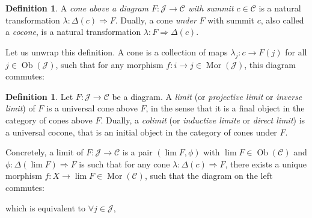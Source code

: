 \documentclass{article}
\newcommand{\cat}{\mathcal{C}}
\newcommand{\Jcat}{\mathcal{J}}
\DeclareMathOperator{\Ob}{Ob}
\DeclareMathOperator{\Mor}{Mor}
\theoremstyle{plain}
\theoremstyle{definition}
\newtheorem{definition}[theorem]{Definition}
\theoremstyle{remark}
\begin{document}
\begin{definition}
    A \emph{cone above a diagram $F : \Jcat \to \cat$ with summit $c\in \cat$} is a natural transformation $\lambda : \Delta(c) \Rightarrow F$. Dually, a cone \emph{under} $F$ with summit $c$, also called a \emph{cocone}, is a natural transformation $\lambda : F \Rightarrow \Delta(c)$.
\end{definition}

Let us unwrap this definition. A cone is a collection of maps $\lambda_j : c \to F(j)$ for all $j \in \Ob(\Jcat)$, such that for any morphism $f : i \to j \in \Mor(\Jcat)$, this diagram commutes:
\begin{center}
\end{center}

\begin{definition}
    Let $F : \Jcat \to \cat$ be a diagram. A \emph{limit} (or \emph{projective limit} or \emph{inverse limit}) of $F$ is a universal cone above $F$, in the sense that it is a final object in the category of cones above $F$. Dually, a \emph{colimit} (or \emph{inductive limite} or \emph{direct limit}) is a universal cocone, that is an initial object in the category of cones under $F$.
\end{definition}

Concretely, a limit of $F : \Jcat \to \cat$ is a pair $(\lim F, \phi)$ with $\lim F \in \Ob(\cat)$ and $\phi : \Delta(\lim F) \Rightarrow F$ is such that for any cone $\lambda : \Delta(c) \Rightarrow F$, there exists a unique morphism $f : X \to \lim F \in \Mor(\cat)$, such that the diagram on the left commutes:
\begin{center}
    \hspace{1cm}
    which is equivalent to
    \hspace{1cm}
    $\forall j \in \Jcat$,
\end{center}
\end{document}
